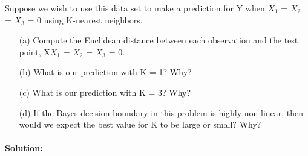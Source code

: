 \documentclass[a4paper,12pt,titlepage]{article} %
\begin{document}
Suppose we wish to use this data set to make a prediction for Y when $X_{1}$ = $X_{2}$ = $X_{3}$ = 0 using K-nearest neighbors.

\begin{itemize}
	\item[(a)] Compute the Euclidean distance between each observation and the test point, X$X_{1}$ = $X_{2}$ = $X_{3}$ = 0.
	\item[(b)] What is our prediction with K = 1? Why?
	\item[(c)] What is our prediction with K = 3? Why?
	\item[(d)] If the Bayes decision boundary in this problem is highly non-linear, then would we expect the best value for K to be large or small? Why?
\end{itemize}
\paragraph{Solution:}




\newpage
\end{document}
